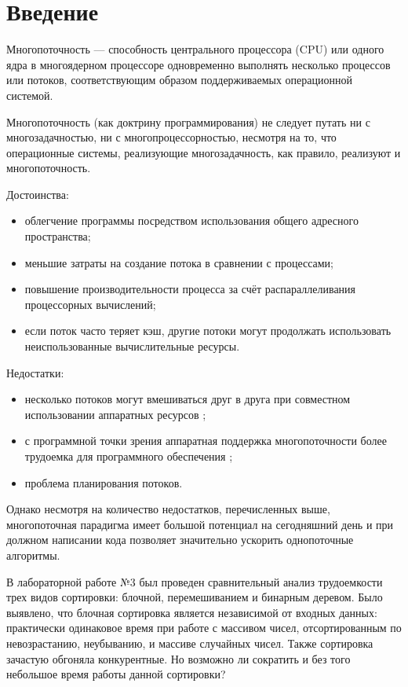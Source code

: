 \chapter*{Введение}

Многопоточность — способность центрального процессора (CPU) или одного ядра в многоядерном процессоре одновременно выполнять несколько процессов или потоков, соответствующим образом поддерживаемых операционной системой.

Многопоточность (как доктрину программирования) не следует путать ни с многозадачностью, ни с многопроцессорностью, несмотря на то, что операционные системы, реализующие многозадачность, как правило, реализуют и многопоточность.

Достоинства:
\begin{itemize}
	\item облегчение программы посредством использования общего адресного пространства;
	\item меньшие затраты на создание потока в сравнении с процессами;
	\item повышение производительности процесса за счёт распараллеливания процессорных вычислений;
	\item если поток часто теряет кэш, другие потоки могут продолжать использовать неиспользованные вычислительные ресурсы.
\end{itemize}

Недостатки:
\begin{itemize}
	\item несколько потоков могут вмешиваться друг в друга при совместном использовании аппаратных ресурсов \cite{Nemirovsky};
	\item с программной точки зрения аппаратная поддержка многопоточности более трудоемка для программного обеспечения \cite{Olukotun};
	\item проблема планирования потоков.
\end{itemize}


Однако несмотря на количество недостатков, перечисленных выше, многопоточная парадигма имеет большой потенциал на сегодняшний день и при должном написании кода позволяет значительно ускорить однопоточные алгоритмы.

\newpage

В лабораторной работе №3 был проведен сравнительный анализ трудоемкости трех видов сортировки: блочной, перемешиванием и бинарным деревом. Было выявлено, что блочная сортировка является независимой от входных данных: практически одинаковое время при работе с массивом чисел, отсортированным по невозрастанию, неубыванию, и массиве случайных чисел. Также сортировка зачастую обгоняла конкурентные. Но возможно ли сократить и без того небольшое время работы данной сортировки? 


